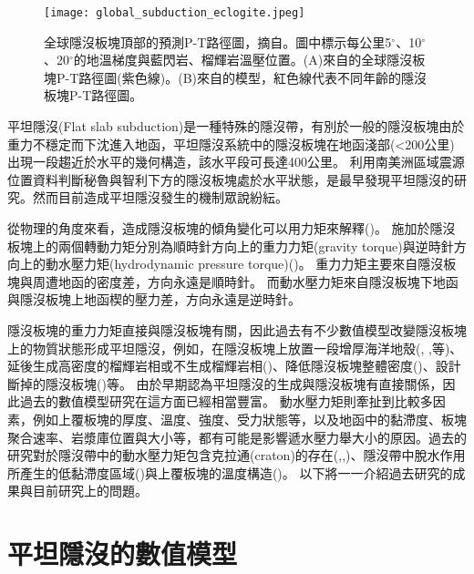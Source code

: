\begin{figure*}[ht!]
    \centering
    \texttt{[image: global\_subduction\_eclogite.jpeg]}
    \caption{
    全球隱沒板塊頂部的預測P-T路徑圖，摘自\citealp{penniston2015global}。圖中標示每公里5$^\circ$、10$^\circ$、20$^\circ$的地溫梯度與藍閃岩、榴輝岩溫壓位置。(A)來自\citealp{syracuse2010global}的全球隱沒板塊P-T路徑圖(紫色線)。(B)來自\citealp{gerya2002exhumation}的模型，紅色線代表不同年齡的隱沒板塊P-T路徑圖。
    }
    \label{fig::global_subduction_eclogite}
\end{figure*}


平坦隱沒(Flat slab subduction)是一種特殊的隱沒帶，有別於一般的隱沒板塊由於重力不穩定而下沈進入地函，平坦隱沒系統中的隱沒板塊在地函淺部(<200公里)出現一段趨近於水平的幾何構造，該水平段可長達400公里。
\citealp{barazangi1976}利用南美洲區域震源位置資料判斷秘魯與智利下方的隱沒板塊處於水平狀態，是最早發現平坦隱沒的研究。然而目前造成平坦隱沒發生的機制眾說紛紜。

從物理的角度來看，造成隱沒板塊的傾角變化可以用力矩來解釋(\citealp{stevenson1977angle})。
施加於隱沒板塊上的兩個轉動力矩分別為順時針方向上的重力力矩(gravity torque)與逆時針方向上的動水壓力矩(hydrodynamic pressure torque)(\citealp{McKenzie1969})。
重力力矩主要來自隱沒板塊與周遭地函的密度差，方向永遠是順時針。
而動水壓力矩來自隱沒板塊下地函與隱沒板塊上地函楔的壓力差，方向永遠是逆時針。

隱沒板塊的重力力矩直接與隱沒板塊有關，因此過去有不少數值模型改變隱沒板塊上的物質狀態形成平坦隱沒，例如，在隱沒板塊上放置一段增厚海洋地殼(\citealp{van2002role}, \citealp{Liu2016},\citealp{Hu2016}等)、延後生成高密度的榴輝岩相或不生成榴輝岩相(\citealp{van2002role})、降低隱沒板塊整體密度(\citealp{Gerya2009})、設計斷掉的隱沒板塊(\citealp{Liu2016})等。
由於早期認為平坦隱沒的生成與隱沒板塊有直接關係，因此過去的數值模型研究在這方面已經相當豐富。
動水壓力矩則牽扯到比較多因素，例如上覆板塊的厚度、溫度、強度、受力狀態等，以及地函中的黏滯度、板塊聚合速率、岩漿庫位置與大小等，都有可能是影響遞水壓力舉大小的原因。過去的研究對於隱沒帶中的動水壓力矩包含克拉通(craton)的存在(\citealp{Manea2012Chile},\citealp{Liu2016},\citealp{Hu2016})、隱沒帶中脫水作用所產生的低黏滯度區域(\citealp{Manea2007})與上覆板塊的溫度構造(\citealp{Thermal2012})。
以下將一一介紹過去研究的成果與目前研究上的問題。

\section{平坦隱沒的數值模型}
